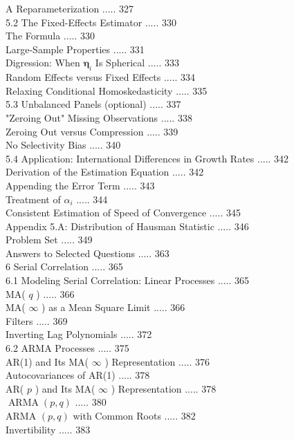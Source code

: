 \documentclass[10pt]{article}
\begin{document}
A Reparameterization ..... 327\\
5.2 The Fixed-Effects Estimator ..... 330\\
The Formula ..... 330\\
Large-Sample Properties ..... 331\\
Digression: When $\boldsymbol{\eta}_{i}$ Is Spherical ..... 333\\
Random Effects versus Fixed Effects ..... 334\\
Relaxing Conditional Homoskedasticity ..... 335\\
5.3 Unbalanced Panels (optional) ..... 337\\
"Zeroing Out" Missing Observations ..... 338\\
Zeroing Out versus Compression ..... 339\\
No Selectivity Bias ..... 340\\
5.4 Application: International Differences in Growth Rates ..... 342\\
Derivation of the Estimation Equation ..... 342\\
Appending the Error Term ..... 343\\
Treatment of $\alpha_{i}$ ..... 344\\
Consistent Estimation of Speed of Convergence ..... 345\\
Appendix 5.A: Distribution of Hausman Statistic ..... 346\\
Problem Set ..... 349\\
Answers to Selected Questions ..... 363\\
6 Serial Correlation ..... 365\\
6.1 Modeling Serial Correlation: Linear Processes ..... 365\\
MA( $q$ ) ..... 366\\
MA( $\infty$ ) as a Mean Square Limit ..... 366\\
Filters ..... 369\\
Inverting Lag Polynomials ..... 372\\
6.2 ARMA Processes ..... 375\\
AR(1) and Its MA( $\infty$ ) Representation ..... 376\\
Autocovariances of AR(1) ..... 378\\
AR( $p$ ) and Its MA( $\infty$ ) Representation ..... 378\\
$\operatorname{ARMA}(p, q)$ ..... 380\\
ARMA $(p, q)$ with Common Roots ..... 382\\
Invertibility ..... 383\\
\end{document}
